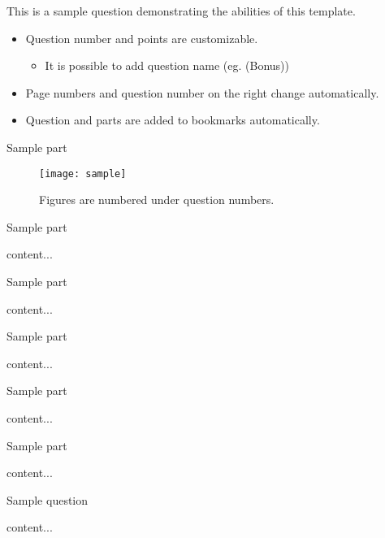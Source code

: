 \documentclass[11pt]{article} %
\begin{document}
\begin{qstn}[15][(Bonus) ][49.5]
	This is a sample question demonstrating the abilities of this template.
	\begin{itemize}
		\item Question number and points are customizable.
		\begin{itemize}
			\item It is possible to add question name (eg. (Bonus))
		\end{itemize}
		\item Page numbers and question number on the right change automatically.
		\item Question and parts are added to bookmarks automatically.
	\end{itemize}
	\begin{soln}
	\end{soln}
	\begin{assgnenum}
		\qitem Sample part
		\begin{soln}
			\begin{figure}[H]
				\centering
				\texttt{[image: sample]}
				\caption{Figures are numbered under question numbers.}
			\end{figure}
			\vfill
		\end{soln}
		\newpage
		\qitem Sample part
		\begin{soln}
			content...
			\vfill
		\end{soln}
		\begin{assgnenum}
			\qitem Sample part
			\begin{soln}
				content...
				\vfill
			\end{soln}
			\qitem Sample part
			\begin{soln}
				content...
				\vfill
			\end{soln}
			\newpage
			\qitem Sample part
			\begin{soln}
				content...
				\vfill
			\end{soln}
		\end{assgnenum}
		\qitem Sample part
		\begin{soln}
			content...
			\vfill
		\end{soln}
	\end{assgnenum}
\end{qstn}
 
\begin{qstn}[8]
	Sample question
\begin{soln}
	content...
\end{soln}
\end{qstn}
\end{document}
